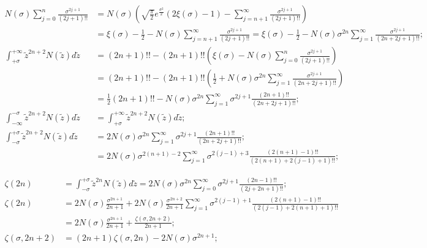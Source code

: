 \documentclass[twoside]{article}
\numberwithin{equation}{section}
\begin{document}
\begin{align*}
N(\sigma) \sum_{j=0}^{n} \frac{\sigma^{2j+1}}{(2j+1)!!} 
 & = N(\sigma) \left( \sqrt{\frac{\pi}{2}} e^{\frac{\sigma^2}{2}} (2 \xi(\sigma) - 1) - \sum_{j=n+1}^{\infty} \frac{\sigma^{2j+1}}{(2j+1)!!} \right) \\
 &= \xi(\sigma) - \frac{1}{2} - N(\sigma) \sum_{j=n+1}^{\infty} \frac{\sigma^{2j+1}}{(2j+1)!!} 
  = \xi(\sigma) - \frac{1}{2} - N(\sigma) \sigma^{2n} \sum_{j=1}^{\infty} \frac{\sigma^{2j+1}}{(2n + 2j+1)!!}; \\
\int_{+\sigma}^{+\infty} \tilde{z}^{2n + 2} N(\tilde{z}) d \tilde{z} 
 &= (2n+1)!! - (2n+1)!! \left(\xi(\sigma) - N(\sigma) \sum_{j=0}^{n} \frac{\sigma^{2j + 1}}{(2j + 1)!!} \right) \\
 &= (2n+1)!! - (2n+1)!! \left(\frac{1}{2} + N(\sigma) \sigma^{2n} \sum_{j=1}^{\infty} \frac{\sigma^{2j+1}}{(2n + 2j+1)!!} \right) \\
 &= \frac{1}{2} (2n+1)!! - N(\sigma) \sigma^{2n} \sum_{j=1}^{\infty} \sigma^{2j+1} \frac{(2n+1)!!}{(2n + 2j+1)!!}; \\
\int_{-\infty}^{-\sigma} \tilde{z}^{2n + 2} N(\tilde{z}) d \tilde{z} &= \int_{+\sigma}^{+\infty} \tilde{z}^{2n + 2} N(\tilde{z}) d \tilde{z}; \\
\int_{-\sigma}^{+\sigma} \tilde{z}^{2n + 2} N(\tilde{z}) d \tilde{z} &= 2 N(\sigma) \sigma^{2n} \sum_{j=1}^{\infty} \sigma^{2j+1} \frac{(2n+1)!!}{(2n + 2j+1)!!}; \\
 &= 2 N(\sigma) \sigma^{2(n+1)-2} \sum_{j=1}^{\infty} \sigma^{2(j-1) + 3} \frac{(2(n+1)-1)!!}{(2(n+1) + 2(j-1) + 1)!!};
\end{align*}

\begin{align*}
\zeta(2n) &= \int_{-\sigma}^{+\sigma} \tilde{z}^{2n} N(\tilde{z}) d \tilde{z} = 2 N(\sigma) \sigma^{2n} \sum_{j=0}^{\infty} \sigma^{2j+1} \frac{(2n-1)!!}{(2j + 2n+1)!!}; \\
\zeta(2n) &= 2 N(\sigma) \frac{\sigma^{2n+1}}{2n + 1} + 2 N(\sigma) \frac{\sigma^{2n+2}}{2n+1} \sum_{j=1}^{\infty} \sigma^{2(j-1)+1} \frac{(2(n+1)- 1)!!}{(2(j-1)+2(n+1)+1)!!} \\
 &= 2 N(\sigma) \frac{\sigma^{2n + 1}}{2n + 1} + \frac{\zeta(\sigma, 2n + 2)}{2n + 1}; \\
\zeta(\sigma, 2n + 2) &= (2n + 1) \zeta(\sigma, 2n) - 2 N(\sigma) \sigma^{2n + 1};
\end{align*}
\end{document}
